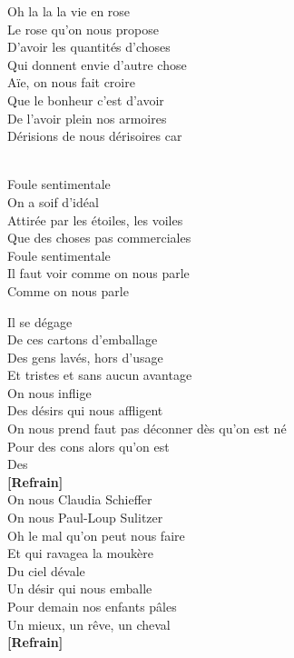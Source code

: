 \documentclass{novel}
\begin{document}
\begin{multicols}{2}
Oh la la la vie en rose \\
Le rose qu'on nous propose \\
D'avoir les quantités d'choses \\
Qui donnent envie d'autre chose \\
Aïe, on nous fait croire \\
Que le bonheur c'est d'avoir \\
De l'avoir plein nos armoires \\
Dérisions de nous dérisoires car \\

\begin{bfseries}
[Refrain:]\\
Foule sentimentale \\
On a soif d'idéal \\
Attirée par les étoiles, les voiles \\
Que des choses pas commerciales \\
Foule sentimentale \\
Il faut voir comme on nous parle \\
Comme on nous parle \\
\end{bfseries}

\columnbreak
Il se dégage \\
De ces cartons d'emballage \\
Des gens lavés, hors d'usage \\
Et tristes et sans aucun avantage \\
On nous inflige \\
Des désirs qui nous affligent \\
On nous prend faut pas déconner dès qu'on est né \\
Pour des cons alors qu'on est \\
Des \\

\textbf{[Refrain]} \\

On nous Claudia Schieffer \\
On nous Paul-Loup Sulitzer \\
Oh le mal qu'on peut nous faire \\
Et qui ravagea la moukère \\
Du ciel dévale \\
Un désir qui nous emballe \\
Pour demain nos enfants pâles \\
Un mieux, un rêve, un cheval \\

\textbf{[Refrain]} \\
\end{multicols}
\end{document}
